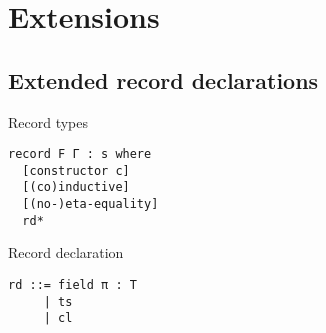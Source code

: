 \documentclass[acmlarge,fleqn]{acmart}\settopmatter{}
\renewcommand{\|}{\mid}
\begin{document}
\section{Extensions}
\label{sec:extensions}

\subsection{Extended record declarations}

Record types
\begin{verbatim}
record F Γ : s where
  [constructor c]
  [(co)inductive]
  [(no-)eta-equality]
  rd*
\end{verbatim}

Record declaration
\begin{verbatim}
rd ::= field π : T
     | ts
     | cl
\end{verbatim}


\begin{acks}                            %
\end{acks}


%


\end{document}
